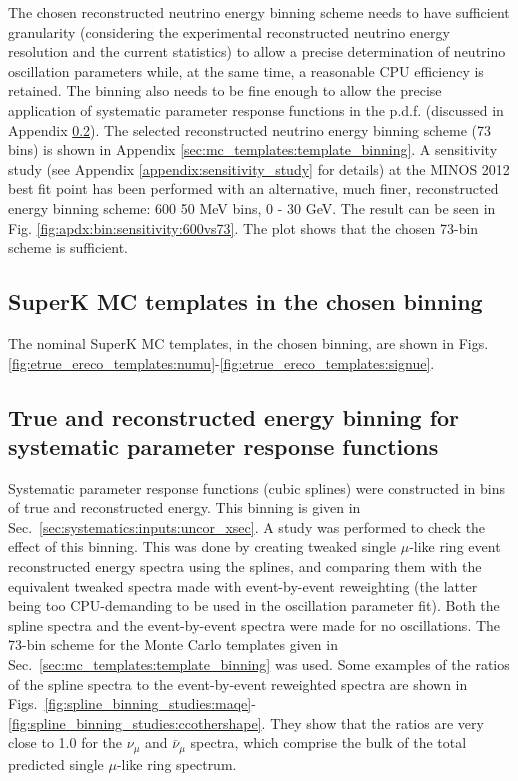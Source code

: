 The chosen reconstructed neutrino energy binning scheme needs to have sufficient granularity 
(considering the experimental reconstructed neutrino energy resolution and the current statistics)
to allow a precise determination of neutrino oscillation parameters while, at the same time,
a reasonable CPU efficiency is retained.
The binning also needs to be fine enough to allow the precise application of systematic parameter response functions
in the p.d.f. (discussed in Appendix \ref{appendix:mc_template_binning_studies:spline}).
The selected reconstructed neutrino energy binning scheme (73 bins) is shown in Appendix \ref{sec:mc_templates:template_binning}.
A sensitivity study (see Appendix \ref{appendix:sensitivity_study} for details) at the MINOS 2012 best fit point
has been performed with an alternative, much finer, reconstructed energy binning scheme: 600 50 MeV bins, 0 - 30 GeV.
The result can be seen in Fig. \ref{fig:apdx:bin:sensitivity:600vs73}.
The plot shows that the chosen 73-bin scheme is sufficient.


\subsection{SuperK MC templates in the chosen binning}
\label{appendix:mc_template_binning_studies:templates}

The nominal SuperK MC templates, in the chosen binning, are shown 
in Figs. \ref{fig:etrue_ereco_templates:numu}-\ref{fig:etrue_ereco_templates:signue}.


\subsection{True and reconstructed energy binning for systematic parameter response functions}
\label{appendix:mc_template_binning_studies:spline} 

Systematic parameter response functions (cubic splines) were constructed in bins of true and reconstructed energy.
This binning is given in Sec.\ \ref{sec:systematics:inputs:uncor_xsec}.
A study was performed to check the effect of this binning.
This was done by creating tweaked single $\mu$-like ring event reconstructed energy spectra using the splines, and comparing them with 
the equivalent tweaked spectra made with event-by-event reweighting (the latter being too CPU-demanding to be used in the oscillation parameter fit). 
Both the spline spectra and the event-by-event spectra were made for no oscillations.
The 73-bin scheme for the Monte Carlo templates given in Sec.\ \ref{sec:mc_templates:template_binning} was used. 
Some examples of the ratios of the 
spline spectra to the event-by-event reweighted spectra are shown in Figs.\ \ref{fig:spline_binning_studies:maqe}-\ref{fig:spline_binning_studies:ccothershape}. 
They show that the ratios are very close to 1.0 for the $\nu_{\mu}$ and $\bar{\nu}_{\mu}$ spectra,
which comprise the bulk of the total predicted single $\mu$-like ring spectrum. 


